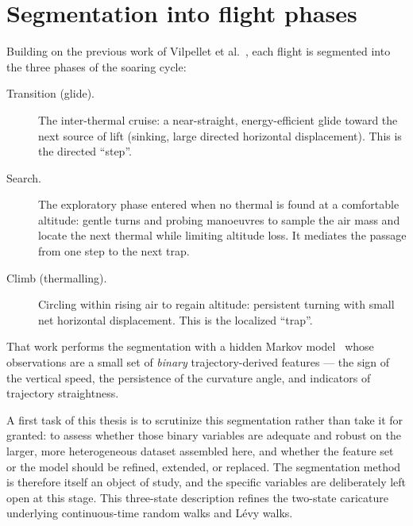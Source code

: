 \section{Segmentation into flight phases}
\label{sec:segmentation}
Building on the previous work of Vilpellet et al.~\cite{vilpellet2026}, each flight is
segmented into the three phases of the soaring cycle:
\begin{description}
  \item[Transition (glide).] The inter-thermal cruise: a near-straight, energy-efficient
        glide toward the next source of lift (sinking, large directed horizontal
        displacement). This is the directed ``step''.
  \item[Search.] The exploratory phase entered when no thermal is found at a comfortable
        altitude: gentle turns and probing manoeuvres to sample the air mass and locate the
        next thermal while limiting altitude loss. It mediates the passage from one step to
        the next trap.
  \item[Climb (thermalling).] Circling within rising air to regain altitude: persistent
        turning with small net horizontal displacement. This is the localized ``trap''.
\end{description}
That work performs the segmentation with a hidden Markov model~\cite{rabiner1989} whose observations are a
small set of \emph{binary} trajectory-derived features --- the sign of the vertical speed,
the persistence of the curvature angle, and indicators of trajectory straightness.

A first task of this thesis is to scrutinize this segmentation rather than take it for
granted: to assess whether those binary variables are adequate and robust on the larger,
more heterogeneous dataset assembled here, and whether the feature set or the model should
be refined, extended, or replaced. The segmentation method is therefore itself an object of
study, and the specific variables are deliberately left open at this stage. This
three-state description refines the two-state caricature underlying continuous-time random
walks and L\'evy walks.

